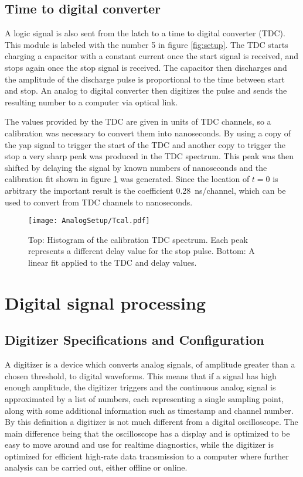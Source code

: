 \documentclass[main.tex]{subfiles}
\begin{document}
\subsection{Time to digital converter}
A logic signal is also sent from the latch to a time to digital converter (TDC). This module is labeled with the number 5 in figure \ref{fig:setup}. The TDC starts charging a capacitor with a constant current once the start signal is received, and stops again once the stop signal is received. The capacitor then discharges and the amplitude of the discharge pulse is proportional to the time between start and stop\cite{CAENTDC}. An analog to digital converter then digitizes the pulse and sends the resulting number to a computer via optical link.

The values provided by the TDC are given in units of TDC channels, so a calibration was necessary to convert them into nanoseconds. By using a copy of the yap signal to trigger the start of the TDC and another copy to trigger the stop a very sharp peak was produced in the TDC spectrum. This peak was then shifted by delaying the signal by known numbers of nanoseconds and the calibration fit shown in figure \ref{fig:Tcal} was generated. Since the location of $t=0$ is arbitrary the important result is the coefficient \SI{0.28}{\nano\second/channel}, which can be used to convert from TDC channels to nanoseconds.
\begin{figure}[ht]
	\centering
    	\texttt{[image: AnalogSetup/Tcal.pdf]}
        \caption[TDC calibration of analog setup]{Top: Histogram of the calibration TDC spectrum. Each peak represents a different delay value for the stop pulse. Bottom: A linear fit applied to the TDC and delay values.}
	    \label{fig:Tcal} 
\end{figure}

\section{Digital signal processing}
\subsection{Digitizer Specifications and Configuration}
A digitizer is a device which converts analog signals, of amplitude greater than a chosen threshold, to digital waveforms. This means that if a signal has high enough amplitude, the digitizer triggers and the continuous analog signal is approximated by a list of numbers, each representing a single sampling point, along with some additional information such as timestamp and channel number. By this definition a digitizer is not much different from a digital oscilloscope. The main difference being that the oscilloscope has a display and is optimized to be easy to move around and use for realtime diagnostics, while the digitizer is optimized for efficient high-rate data transmission to a computer where further analysis can be carried out, either offline or online.
\end{document}
